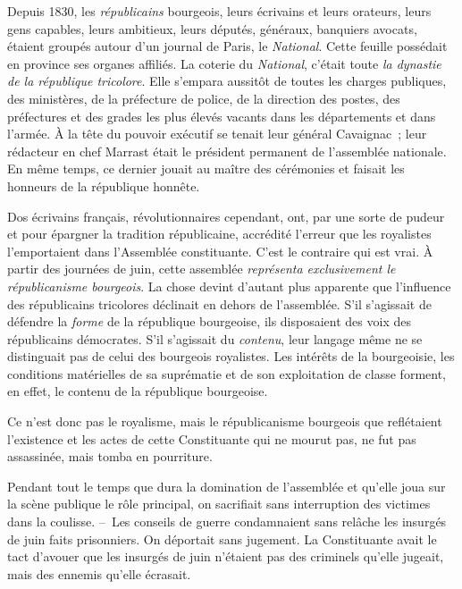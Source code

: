 \documentclass[twoside]{book} %
\begin{document}
Depuis 1830, les \emph{républicains} bourgeois, leurs écrivains et leurs orateurs, leurs gens capables, leurs ambitieux, leurs députés, généraux, banquiers avocats, étaient groupés autour d’un journal de Paris, le \emph{National}. Cette feuille possédait en province ses organes affiliés. La coterie du \emph{National}, c’était toute \emph{la dynastie de la république tricolore}. Elle s’empara aussitôt de toutes les charges publiques, des ministères, de la préfecture de police, de la direction des postes, des préfectures et des grades les plus élevés vacants dans les départements et dans l’armée. À la tête du pouvoir exécutif se tenait leur général Cavaignac ; leur rédacteur en chef Marrast était le président permanent de l’assemblée nationale. En même temps, ce dernier jouait au maître des cérémonies et faisait les honneurs de la république honnête.\par
Dos écrivains français, révolutionnaires cependant, ont, par une sorte de pudeur et pour épargner la tradition républicaine, accrédité l’erreur que les royalistes l’emportaient dans l’Assemblée constituante. C’est le contraire qui est vrai. À partir des journées de juin, cette assemblée \emph{représenta exclusivement le républicanisme bourgeois}. La chose devint d’autant plus apparente que l’influence des républicains tricolores déclinait en dehors de l’assemblée. S’il s’agissait de défendre la \emph{forme} de la république bourgeoise, ils disposaient des voix des républicains démocrates. S’il s’agissait du \emph{contenu}, leur langage même ne se distinguait pas de celui des bourgeois royalistes. Les intérêts de la bourgeoisie, les conditions matérielles de sa suprématie et de son exploitation de classe forment, en effet, le contenu de la république bourgeoise.\par
Ce n’est donc pas le royalisme, mais le républicanisme bourgeois que reflétaient l’existence et les actes de cette Constituante qui ne mourut pas, ne fut pas assassinée, mais tomba en pourriture.\par
Pendant tout le temps que dura la domination de l’assemblée et qu’elle joua sur la scène publique le rôle principal, on sacrifiait sans interruption des victimes dans la coulisse. – Les conseils de guerre condamnaient sans relâche les insurgés de juin faits prisonniers. On déportait sans jugement. La Constituante avait le tact d’avouer que les insurgés de juin n’étaient pas des criminels qu’elle jugeait, mais des ennemis qu’elle écrasait.\par
\end{document}

